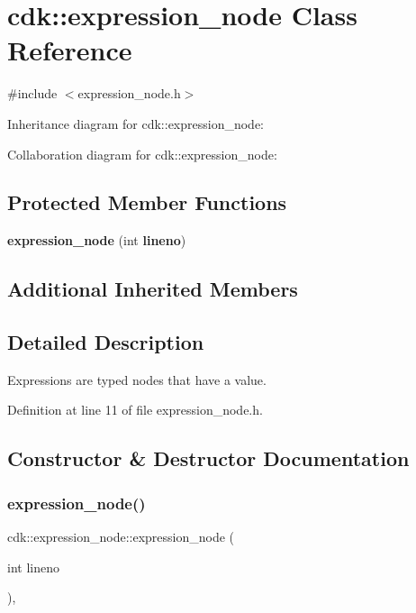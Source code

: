 \section{cdk\+:\+:expression\+\_\+node Class Reference}
\label{classcdk_1_1expression__node}


{\ttfamily \#include $<$expression\+\_\+node.\+h$>$}



Inheritance diagram for cdk\+:\+:expression\+\_\+node\+:


Collaboration diagram for cdk\+:\+:expression\+\_\+node\+:
\subsection*{Protected Member Functions}
\begin{DoxyCompactItemize}
\item 
\textbf{ expression\+\_\+node} (int \textbf{ lineno})
\end{DoxyCompactItemize}
\subsection*{Additional Inherited Members}


\subsection{Detailed Description}
Expressions are typed nodes that have a value. 

Definition at line 11 of file expression\+\_\+node.\+h.



\subsection{Constructor \& Destructor Documentation}
\mbox{\label{classcdk_1_1expression__node_a026555785146a09f2d53d56e1bb1e984}} 
\subsubsection{expression\+\_\+node()}
{\footnotesize\ttfamily cdk\+::expression\+\_\+node\+::expression\+\_\+node (\begin{DoxyParamCaption}\item[{int}]{lineno }\end{DoxyParamCaption})\hspace{0.3cm}{\ttfamily [inline]}, {\ttfamily [protected]}}


